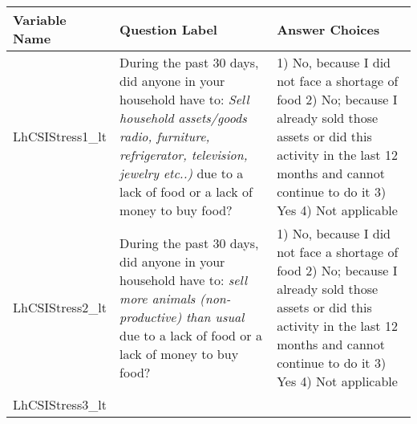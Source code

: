 \documentclass[
]{article}
\begin{document}
\begin{longtable}[]{@{}lll@{}}
\toprule
\begin{minipage}[b]{0.15\columnwidth}\raggedright
Variable Name\strut
\end{minipage} & \begin{minipage}[b]{0.49\columnwidth}\raggedright
Question Label\strut
\end{minipage} & \begin{minipage}[b]{0.27\columnwidth}\raggedright
Answer Choices\strut
\end{minipage}\tabularnewline
\midrule
\endhead
\begin{minipage}[t]{0.15\columnwidth}\raggedright
LhCSIStress1\_lt\strut
\end{minipage} & \begin{minipage}[t]{0.49\columnwidth}\raggedright
During the past 30 days, did anyone in your household have to: \emph{Sell household assets/goods radio, furniture, refrigerator, television, jewelry etc..)} due to a lack of food or a lack of money to buy food?\strut
\end{minipage} & \begin{minipage}[t]{0.27\columnwidth}\raggedright
1) No, because I did not face a shortage of food 2) No; because I already sold those assets or did this activity in the last 12 months and cannot continue to do it 3) Yes 4) Not applicable\strut
\end{minipage}\tabularnewline
\begin{minipage}[t]{0.15\columnwidth}\raggedright
LhCSIStress2\_lt\strut
\end{minipage} & \begin{minipage}[t]{0.49\columnwidth}\raggedright
During the past 30 days, did anyone in your household have to: \emph{sell more animals (non-productive) than usual} due to a lack of food or a lack of money to buy food?\strut
\end{minipage} & \begin{minipage}[t]{0.27\columnwidth}\raggedright
1) No, because I did not face a shortage of food 2) No; because I already sold those assets or did this activity in the last 12 months and cannot continue to do it 3) Yes 4) Not applicable\strut
\end{minipage}\tabularnewline
\begin{minipage}[t]{0.15\columnwidth}\raggedright
LhCSIStress3\_lt\strut
\end{minipage} & \begin{minipage}[t]{0.49\columnwidth}\raggedright

\end{minipage}
\end{longtable}
\end{document}
